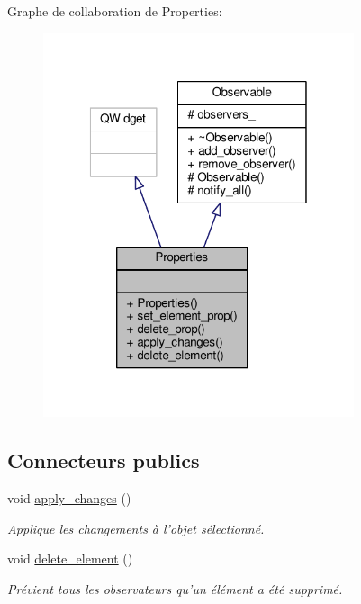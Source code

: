 Graphe de collaboration de Properties\+:\nopagebreak
\begin{figure}[H]
\begin{center}
\leavevmode
\includegraphics[width=259pt]{dc/d0a/classProperties__coll__graph}
\end{center}
\end{figure}
\subsection*{Connecteurs publics}
\begin{DoxyCompactItemize}
\item 
\hypertarget{classProperties_aa8e9e5c83983a60486d963d2e5b97bf9}{void \hyperlink{classProperties_aa8e9e5c83983a60486d963d2e5b97bf9}{apply\+\_\+changes} ()}\label{classProperties_aa8e9e5c83983a60486d963d2e5b97bf9}

\begin{DoxyCompactList}\small\item\em Applique les changements à l’objet sélectionné. \end{DoxyCompactList}\item 
\hypertarget{classProperties_acb83b3e38f6bbe0cd57d0cf123460253}{void \hyperlink{classProperties_acb83b3e38f6bbe0cd57d0cf123460253}{delete\+\_\+element} ()}\label{classProperties_acb83b3e38f6bbe0cd57d0cf123460253}

\begin{DoxyCompactList}\small\item\em Prévient tous les observateurs qu’un élément a été supprimé. \end{DoxyCompactList}\end{DoxyCompactItemize}
